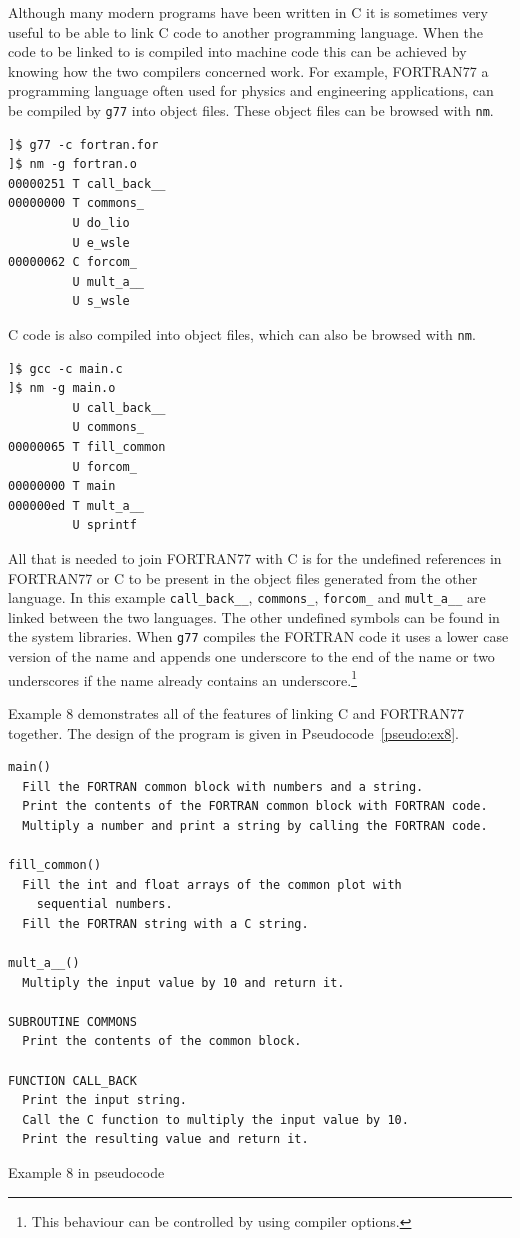 \documentclass[11pt]{scrartcl}
\def\psc{Pseudocode}
\begin{document}
Although many modern programs have been written in C it is sometimes
very useful to be able to link C code to another programming language.  When the code to be linked to is compiled into machine code this can be achieved by knowing how the two compilers concerned work.  For example, FORTRAN77 a programming language often used for physics and engineering applications, can be compiled by \texttt{g77} into object files.  These object files can be browsed with \texttt{nm}.  
\begin{verbatim}
]$ g77 -c fortran.for
]$ nm -g fortran.o 
00000251 T call_back__
00000000 T commons_
         U do_lio
         U e_wsle
00000062 C forcom_
         U mult_a__
         U s_wsle
\end{verbatim}
C code is also compiled into object files, which can also be browsed
with \texttt{nm}.
\begin{verbatim}
]$ gcc -c main.c 
]$ nm -g main.o
         U call_back__
         U commons_
00000065 T fill_common
         U forcom_
00000000 T main
000000ed T mult_a__
         U sprintf
\end{verbatim}
All that is needed to join FORTRAN77 with C is for the undefined
references in FORTRAN77 or C to be present in the object files
generated from the other language.  In this example
\texttt{call\_back\_\_}, \texttt{commons\_}, \texttt{forcom\_} and
\texttt{mult\_a\_\_} are linked between the two languages.  The other
undefined symbols can be found in the system libraries.  When
\texttt{g77} compiles the FORTRAN code it uses a lower case version of
the name and appends one underscore to  the end of the name or two
underscores if the name already contains an underscore.\footnote{This
behaviour can be controlled by using compiler options.}

Example 8 demonstrates all of the features of linking C and FORTRAN77
together.  The design of the program is given in \psc~\ref{pseudo:ex8}.

\begin{pseudocode}[h]
\begin{verbatim}
main()
  Fill the FORTRAN common block with numbers and a string.
  Print the contents of the FORTRAN common block with FORTRAN code.
  Multiply a number and print a string by calling the FORTRAN code.

fill_common()
  Fill the int and float arrays of the common plot with 
    sequential numbers.
  Fill the FORTRAN string with a C string.

mult_a__()
  Multiply the input value by 10 and return it.

SUBROUTINE COMMONS
  Print the contents of the common block.

FUNCTION CALL_BACK
  Print the input string.
  Call the C function to multiply the input value by 10.
  Print the resulting value and return it.
\end{verbatim}
\caption{Example 8 in pseudocode \label{pseudo:ex8}}
\end{pseudocode}
\end{document}

